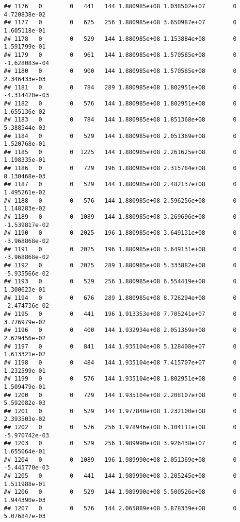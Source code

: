 \documentclass[
]{article}
\begin{document}
\begin{enumerate}
\begin{verbatim}
## 1176   0        0   441   144 1.880985e+08 1.038502e+07        0  4.720838e-02
## 1177   0        0   625   256 1.880985e+08 3.650987e+07        0  1.605118e-01
## 1178   0        0   529   144 1.880985e+08 1.153884e+08        0  1.591799e-01
## 1179   0        0   961   144 1.880985e+08 1.570585e+08        0 -1.628083e-04
## 1180   0        0   900   144 1.880985e+08 1.570585e+08        0  2.346433e-03
## 1181   0        0   784   289 1.880985e+08 1.802951e+08        0 -4.314420e-03
## 1182   0        0   576   144 1.880985e+08 1.802951e+08        0  1.655136e-02
## 1183   0        0   784   144 1.880985e+08 1.851368e+08        0  5.388544e-03
## 1184   0        0   529   144 1.880985e+08 2.051369e+08        0  1.520768e-01
## 1185   0        0  1225   144 1.880985e+08 2.261625e+08        0  1.198335e-01
## 1186   0        0   729   196 1.880985e+08 2.315784e+08        0  8.130468e-03
## 1187   0        0   529   144 1.880985e+08 2.482137e+08        0  1.495261e-02
## 1188   0        0   576   144 1.880985e+08 2.596256e+08        0  1.148283e-02
## 1189   0        0  1089   144 1.880985e+08 3.269696e+08        0 -1.539817e-02
## 1190   0        0  2025   196 1.880985e+08 3.649131e+08        0 -3.968868e-02
## 1191   0        0  2025   196 1.880985e+08 3.649131e+08        0 -3.968868e-02
## 1192   0        0  2025   289 1.880985e+08 5.333882e+08        0 -5.935566e-02
## 1193   0        0   529   256 1.880985e+08 6.554419e+08        0  1.300623e-01
## 1194   0        0   676   289 1.880985e+08 8.726294e+08        0 -2.474736e-02
## 1195   0        0   441   196 1.913353e+08 7.705241e+07        0  3.776979e-02
## 1196   0        0   400   144 1.932934e+08 2.051369e+08        0  2.629456e-02
## 1197   0        0   841   144 1.935104e+08 5.128408e+07        0  1.613321e-02
## 1198   0        0   484   144 1.935104e+08 7.415707e+07        0  1.232599e-01
## 1199   0        0   576   144 1.935104e+08 1.802951e+08        0  1.509479e-01
## 1200   0        0   729   144 1.935104e+08 2.208107e+08        0  5.592082e-03
## 1201   0        0   529   144 1.977848e+08 1.232100e+08        0  2.393503e-02
## 1202   0        0   576   256 1.978946e+08 6.104111e+08        0 -5.970742e-03
## 1203   0        0   529   256 1.989990e+08 3.926438e+07        0  1.655064e-01
## 1204   0        0  1089   196 1.989990e+08 2.051369e+08        0 -5.445770e-03
## 1205   0        0   441   144 1.989990e+08 3.205245e+08        0  1.511988e-01
## 1206   0        0   529   144 1.989990e+08 5.500526e+08        0  1.944390e-03
## 1207   0        0   576   144 2.065889e+08 3.878339e+08        0  5.076847e-03

\end{verbatim}
\end{enumerate}
\end{document}

